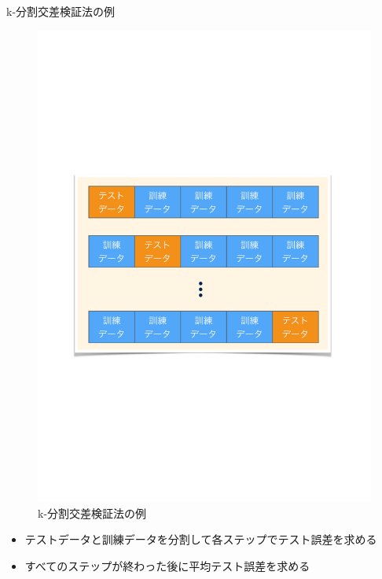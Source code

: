 \documentclass[dvipdfmx, 10pt]{beamer}
\begin{document}
\begin{frame}{k-分割交差検証法の例}
  \begin{figure}[htbp]
     \includegraphics[keepaspectratio, scale=0.4]{./images/k-fold.pdf}
     \caption{k-分割交差検証法の例}
  \end{figure}
  \begin{itemize}
    \item テストデータと訓練データを分割して各ステップでテスト誤差を求める
    \item すべてのステップが終わった後に平均テスト誤差を求める
  \end{itemize}
\end{frame}
\end{document}
